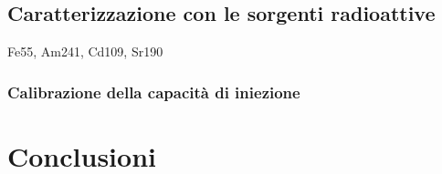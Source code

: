 \documentclass[10pt,a4paper,twoside]{report}
\begin{document}
\section{Caratterizzazione con le sorgenti radioattive}

Fe55, Am241, Cd109, Sr190

\subsection{Calibrazione della capacità di iniezione}


\chapter{Conclusioni}




\printindex



\end{document}
